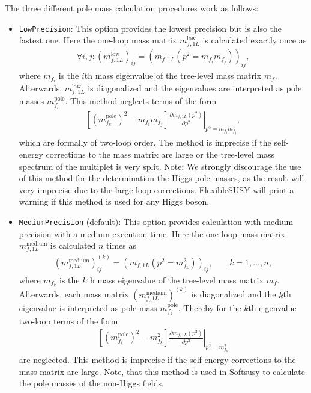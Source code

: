 \documentclass[final,3p,11pt,pdflatex]{elsarticle}
\makeatletter
\newcommand{\fs}{FlexibleSUSY\@\xspace}
\newcommand{\code}[1]{\lstinline|#1|}  %
\newcommand{\pole}{\text{pole}}
\makeatother
\begin{document}
The three different pole mass calculation procedures work as follows:
%
\begin{itemize}
\item \code{LowPrecision}: This option provides the lowest precision
  but is also the fastest one.  Here the one-loop mass matrix
  $m_{f,1L}^\text{low}$ is calculated exactly once as
%
  \begin{align}
    \forall i,j: (m_{f,1L}^\text{low})_{ij} = (m_{f,1L}(p^2 = m_{f_i}
    m_{f_j}))_{ij} ,
  \end{align}
%
  where $m_{f_i}$ is the $i$th mass eigenvalue of the tree-level mass
  matrix $m_f$.  Afterwards, $m_{f,1L}^\text{low}$ is diagonalized and
  the eigenvalues are interpreted as pole masses $m_{f_i}^\pole$.
  This method neglects terms of the form
  \begin{align}
    \left[(m_{f_k}^\pole)^2 - m_{f_i}m_{f_j}\right]
    \left.\frac{\partial m_{f,1L}(p^2)}{\partial
        p^2}\right|_{p^2=m_{f_i}m_{f_j}} ,
  \end{align}
  which are formally of two-loop order.  The method is imprecise if
  the self-energy corrections to the mass matrix are large or the
  tree-level mass spectrum of the multiplet is very split.  Note: We
  strongly discourage the use of this method for the determination the
  Higgs pole masses, as the result will very imprecise due to the
  large loop corrections.  \fs will print a warning if this method is
  used for any Higgs boson.

\item \code{MediumPrecision} (default): This option
  provides calculation with medium precision with a medium execution
  time.  Here the one-loop mass matrix $m_{f,1L}^\text{medium}$ is
  calculated $n$ times as
%
  \begin{align}
    (m_{f,1L}^\text{medium})_{ij}^{(k)} = (m_{f,1L}(p^2 =
    m_{f_k}^2))_{ij} , \qquad k = 1,\ldots,n ,
  \end{align}
%
  where $m_{f_k}$ is the $k$th mass eigenvalue of the tree-level mass
  matrix $m_f$.  Afterwards, each mass matrix
  $(m_{f,1L}^\text{medium})^{(k)}$ is diagonalized and the $k$th
  eigenvalue is interpreted as pole mass $m_{f_k}^\pole$.  Thereby for
  the $k$th eigenvalue two-loop terms of the form
  \begin{align}
    \left[(m_{f_k}^\pole)^2 - m_{f_k}^2\right] \left.\frac{\partial
        m_{f,1L}(p^2)}{\partial p^2}\right|_{p^2=m_{f_k}^2}
  \end{align}
  are neglected.  This method is imprecise if the self-energy
  corrections to the mass matrix are large.  Note, that this method is
  used in Softsusy to calculate the pole masses of the non-Higgs
  fields.


\end{itemize}
\end{document}

